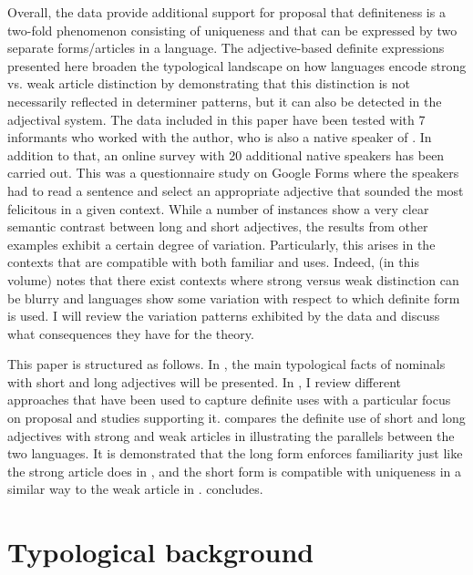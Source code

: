 \documentclass[output=paper,
modfonts
]{langscibook}
\begin{document}
Overall, the  data provide additional support for  proposal that definiteness is a two-fold phenomenon consisting of uniqueness and  that can be expressed by two separate forms/articles in a language. The adjective-based definite expressions presented here broaden the typological landscape on how languages encode strong vs. weak article distinction by demonstrating that this distinction is not necessarily reflected in determiner patterns, but it can also be detected in the adjectival system.
The  data included in this paper have been tested with 7 informants who worked with the author, who is also a native speaker of . In addition to that, an online survey with 20 additional native speakers has been carried out. This was a questionnaire study on Google Forms where the speakers had to read a sentence and select an appropriate adjective that sounded the most felicitous in a given context. While a number of instances show a very clear semantic contrast between long and short adjectives, the results from other examples exhibit a certain degree of variation. Particularly, this arises in the contexts that are compatible with both familiar and  uses. Indeed, \citet{SchwarzToappear} (in this volume) notes that there exist contexts where strong versus weak distinction can be blurry and languages show some variation with respect to which definite form is used. I will review the variation patterns exhibited by the data and discuss what consequences they have for the theory.

This paper is structured as follows. In , the main typological facts of nominals with short and long adjectives will be presented. In , I review different approaches that have been used to capture definite uses with a particular focus on  proposal and studies supporting it.  compares the definite use of short and long adjectives with strong and weak articles in  illustrating the parallels between the two languages. It is demonstrated that the long form enforces familiarity just like the strong article does in , and the short form is compatible with uniqueness in a similar way to the weak article in .  concludes.

\section{Typological background} \label{sec:sereikaite:2} 
\end{document}
